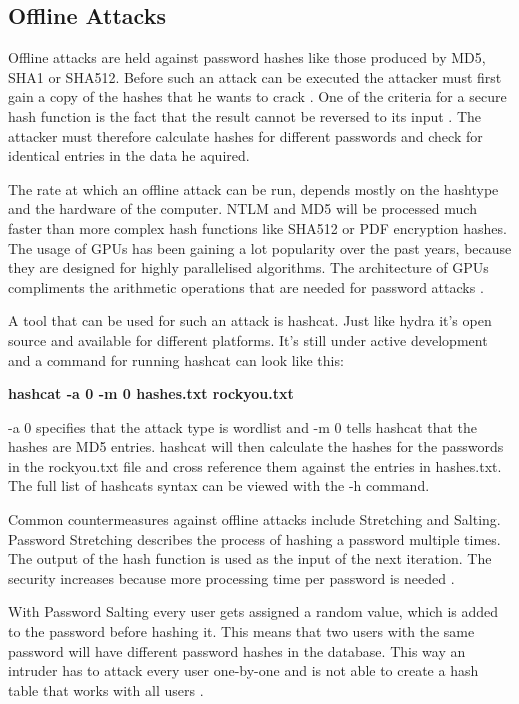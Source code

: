 \newpage

\subsection{Offline Attacks}

Offline attacks are held against password hashes like those produced by MD5, SHA1 or SHA512. Before such an attack can be executed the attacker must first gain a copy of the hashes that he wants to crack \cite{pentesting}. One of the criteria for a secure hash function is the fact that the result cannot be reversed to its input \cite{hashes}. The attacker must therefore calculate hashes for different passwords and check for identical entries in the data he aquired.

The rate at which an offline attack can be run, depends mostly on the hashtype and the hardware of the computer. NTLM and MD5 will be processed much faster than more complex hash functions like SHA512 or PDF encryption hashes. The usage of GPUs has been gaining a lot popularity over the past years, because they are designed for highly parallelised algorithms. The architecture of GPUs compliments the arithmetic operations that are needed for password attacks \cite{gpu}.

A tool that can be used for such an attack is hashcat. Just like hydra it's open source and available for different platforms. It's still under active development and a command for running hashcat can look like this:

\begin{center}
\textbf{hashcat -a 0 -m 0 hashes.txt rockyou.txt}
\end{center}

-a 0 specifies that the attack type is wordlist and -m 0 tells hashcat that the hashes are MD5 entries. hashcat will then calculate the hashes for the passwords in the rockyou.txt file and cross reference them against the entries in hashes.txt. The full list of hashcats syntax can be viewed with the -h command.

Common countermeasures against offline attacks include Stretching and Salting. Password Stretching describes the process of hashing a password multiple times. The output of the hash function is used as the input of the next iteration. The security increases because more processing time per password is needed \cite{anders}. 

With Password Salting every user gets assigned a random value, which is added to the password before hashing it. This means that two users with the same password will have different password hashes in the database. This way an intruder has to attack every user one-by-one and is not able to create a hash table that works with all users \cite{anders}.

\newpage